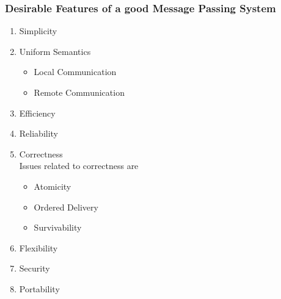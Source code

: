 \documentclass{beamer}
\begin{document}
\begin{frame}
	\frametitle{Desirable Features of a good Message Passing System}
	\begin{enumerate}
		\item Simplicity
		\item Uniform Semantics
		\begin{itemize}
			\item Local Communication
			\item Remote Communication
		\end{itemize}
		\item Efficiency
		\item Reliability
		\item Correctness\\
			Issues related to correctness are
		\begin{itemize}
			\item Atomicity
			\item Ordered Delivery
			\item Survivability
		\end{itemize}
		\item Flexibility
		\item Security
		\item Portability
	\end{enumerate}
\end{frame}
\end{document}
